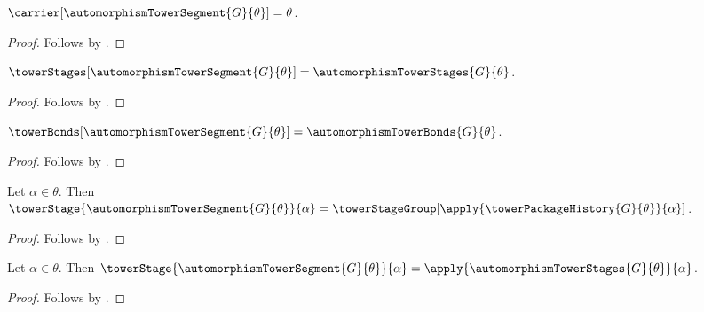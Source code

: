 \begin{proposition}\label{automorphism_tower_segment_carrier}
    $\carrier[\automorphismTowerSegment{G}{\theta}]=\theta$.
\end{proposition}
\begin{proof}
    Follows by
        .
\end{proof}

\begin{proposition}\label{automorphism_tower_segment_stages}
    $\towerStages[\automorphismTowerSegment{G}{\theta}]=
        \automorphismTowerStages{G}{\theta}$.
\end{proposition}
\begin{proof}
    Follows by
        .
\end{proof}

\begin{proposition}\label{automorphism_tower_segment_bonds}
    $\towerBonds[\automorphismTowerSegment{G}{\theta}]=
        \automorphismTowerBonds{G}{\theta}$.
\end{proposition}
\begin{proof}
    Follows by
        .
\end{proof}

\begin{proposition}\label{automorphism_tower_stage_value}
    Let $\alpha\in\theta$.
    Then $\towerStage{\automorphismTowerSegment{G}{\theta}}{\alpha}=
        \towerStageGroup[
            \apply{\towerPackageHistory{G}{\theta}}{\alpha}]$.
\end{proposition}
\begin{proof}
    Follows by
        .
\end{proof}

\begin{proposition}\label{automorphism_tower_stage_family_value}
    Let $\alpha\in\theta$.
    Then $\towerStage{\automorphismTowerSegment{G}{\theta}}{\alpha}=
        \apply{\automorphismTowerStages{G}{\theta}}{\alpha}$.
\end{proposition}
\begin{proof}
    Follows by
        .
\end{proof}

